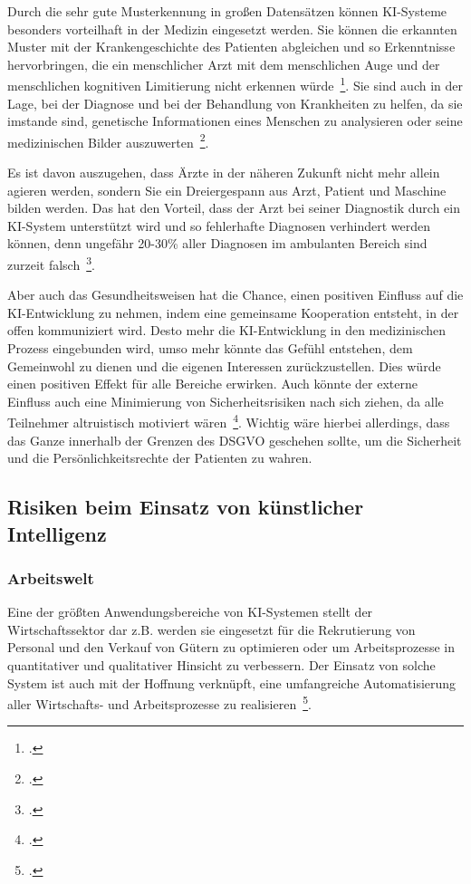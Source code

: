 Durch die sehr gute Musterkennung in großen Datensätzen können \ac{KI}-Systeme besonders vorteilhaft in der Medizin eingesetzt werden. Sie können die erkannten Muster mit
der Krankengeschichte des Patienten abgleichen und so Erkenntnisse hervorbringen, die ein menschlicher Arzt mit dem menschlichen Auge und der menschlichen kognitiven Limitierung nicht 
erkennen würde~\footcite[\vglf][]{Buchkremer.2020}. Sie sind auch in der Lage, bei der Diagnose und bei der Behandlung von Krankheiten zu helfen, 
da sie imstande sind, genetische Informationen eines Menschen zu analysieren oder seine medizinischen Bilder auszuwerten~\footcite[\vglf][]{Robot.2023}.

Es ist davon auszugehen, dass Ärzte in der näheren Zukunft nicht mehr allein agieren werden, sondern Sie ein Dreiergespann aus Arzt, Patient und Maschine bilden werden. 
Das hat den Vorteil, dass der Arzt bei seiner Diagnostik durch ein \ac{KI}-System unterstützt wird und so fehlerhafte Diagnosen verhindert werden können, denn ungefähr 
20-30\% aller Diagnosen im ambulanten Bereich sind zurzeit falsch~\footcite[\vglf][]{Buchkremer.2020}.

Aber auch das Gesundheitsweisen hat die Chance, einen positiven Einfluss auf die \ac{KI}-Entwicklung zu nehmen, indem eine gemeinsame Kooperation entsteht, in der offen kommuniziert wird.
Desto mehr die \ac{KI}-Entwicklung in den medizinischen Prozess eingebunden wird, umso mehr könnte das Gefühl entstehen, dem Gemeinwohl zu dienen und die eigenen
Interessen zurückzustellen. Dies würde einen positiven Effekt für alle Bereiche erwirken. Auch könnte der externe Einfluss auch eine Minimierung von 
Sicherheitsrisiken nach sich ziehen, da alle Teilnehmer altruistisch motiviert wären~\footcite[\vglf][]{Buchkremer.2020}. 
Wichtig wäre hierbei allerdings, dass das Ganze innerhalb der Grenzen des \ac{DSGVO} geschehen sollte, um die Sicherheit und die Persönlichkeitsrechte der Patienten zu wahren.

\subsection{Risiken beim Einsatz von künstlicher Intelligenz}
\subsubsection{Arbeitswelt}
Eine der größten Anwendungsbereiche von \ac{KI}-Systemen stellt der Wirtschaftssektor dar z.B. werden sie eingesetzt für die Rekrutierung von Personal und den Verkauf von Gütern zu optimieren oder um
Arbeitsprozesse in quantitativer und qualitativer Hinsicht zu verbessern. Der Einsatz von solche System ist auch mit der Hoffnung verknüpft, eine umfangreiche
Automatisierung aller Wirtschafts- und Arbeitsprozesse zu realisieren~\footcite[\vglf][]{Heinrichs.2022}.


